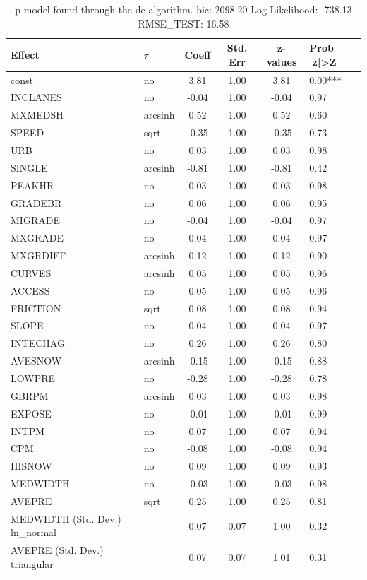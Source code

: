 \begin{table}
	\caption{p model found through the de algorithm. bic: 2098.20 Log-Likelihood: -738.13 RMSE_TEST: 16.58}
	\begin{center}
		\begin{tabular}{|l|l|c|c|c|l|}
			\hline
			Effect & $\tau$ & Coeff & Std. Err & z-values & Prob |z|>Z \\
			\hline
			const & no & 3.81 & 1.00 & 3.81 & 0.00*** \\
			\hline
			INCLANES & no & -0.04 & 1.00 & -0.04 & 0.97 \\
			\hline
			MXMEDSH & arcsinh & 0.52 & 1.00 & 0.52 & 0.60 \\
			\hline
			SPEED & sqrt & -0.35 & 1.00 & -0.35 & 0.73 \\
			\hline
			URB & no & 0.03 & 1.00 & 0.03 & 0.98 \\
			\hline
			SINGLE & arcsinh & -0.81 & 1.00 & -0.81 & 0.42 \\
			\hline
			PEAKHR & no & 0.03 & 1.00 & 0.03 & 0.98 \\
			\hline
			GRADEBR & no & 0.06 & 1.00 & 0.06 & 0.95 \\
			\hline
			MIGRADE & no & -0.04 & 1.00 & -0.04 & 0.97 \\
			\hline
			MXGRADE & no & 0.04 & 1.00 & 0.04 & 0.97 \\
			\hline
			MXGRDIFF & arcsinh & 0.12 & 1.00 & 0.12 & 0.90 \\
			\hline
			CURVES & arcsinh & 0.05 & 1.00 & 0.05 & 0.96 \\
			\hline
			ACCESS & no & 0.05 & 1.00 & 0.05 & 0.96 \\
			\hline
			FRICTION & sqrt & 0.08 & 1.00 & 0.08 & 0.94 \\
			\hline
			SLOPE & no & 0.04 & 1.00 & 0.04 & 0.97 \\
			\hline
			INTECHAG & no & 0.26 & 1.00 & 0.26 & 0.80 \\
			\hline
			AVESNOW & arcsinh & -0.15 & 1.00 & -0.15 & 0.88 \\
			\hline
			LOWPRE & no & -0.28 & 1.00 & -0.28 & 0.78 \\
			\hline
			GBRPM & arcsinh & 0.03 & 1.00 & 0.03 & 0.98 \\
			\hline
			EXPOSE & no & -0.01 & 1.00 & -0.01 & 0.99 \\
			\hline
			INTPM & no & 0.07 & 1.00 & 0.07 & 0.94 \\
			\hline
			CPM & no & -0.08 & 1.00 & -0.08 & 0.94 \\
			\hline
			HISNOW & no & 0.09 & 1.00 & 0.09 & 0.93 \\
			\hline
			MEDWIDTH & no & -0.03 & 1.00 & -0.03 & 0.98 \\
			\hline
			AVEPRE & sqrt & 0.25 & 1.00 & 0.25 & 0.81 \\
			\hline
			MEDWIDTH (Std. Dev.) ln_normal &  & 0.07 & 0.07 & 1.00 & 0.32 \\
			\hline
			AVEPRE (Std. Dev.) triangular &  & 0.07 & 0.07 & 1.01 & 0.31 \\
			\hline
		\end{tabular}
	\end{center}
\end{table}